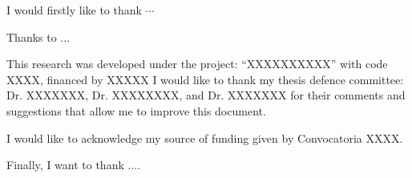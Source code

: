 \begin{acknowledgements}      


I would firstly like to thank $\cdots$
\newline

Thanks to ...
\newline

This research was developed under the project: ``XXXXXXXXXX'' with code XXXX, financed by XXXXX
I would like to thank my thesis defence committee: Dr. XXXXXXX, Dr. XXXXXXXX, and Dr. XXXXXXX for their comments and suggestions that allow me to improve this document.

I would like to acknowledge my source of funding given by Convocatoria XXXX.
\newline

Finally, I want to thank ....


\end{acknowledgements}